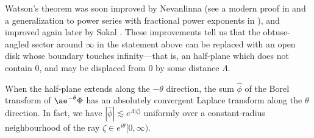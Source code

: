 \documentclass{article}
\newcommand{\aexp}{\mathrm{\ae}}
\theoremstyle{definition}
\theoremstyle{plain}
\begin{document}
Watson's theorem was soon improved by Nevanlinna \cite{nevanlinna} (see a modern proof in \cite[Theorem~B.15]{nikolaev2023exact} and a generalization to power series with fractional power exponents in \cite{delabaere--rosoamanana}), and improved again later by Sokal \cite{sokal1980improvement}. These improvements tell us that the obtuse-angled sector around $\infty$ in the statement above can be replaced with an open disk whose boundary touches infinity---that is, an half-plane which does not contain $0$, and may be displaced from $0$ by some distance $\Lambda$.
\begin{center}
\end{center}
When the half-plane extends along the $-\theta$ direction, the sum $\hat{\phi}$ of the Borel transform of $\aexp^{-\theta} \Phi$ has an absolutely convergent Laplace transform along the $\theta$ direction. In fact, we have $|\hat{\phi}| \lesssim e^{\Lambda |\zeta|}$ uniformly over a constant-radius neighbourhood of the ray $\zeta \in e^{i\theta}[0, \infty)$. 
\begin{center}
\end{center}
\end{document}
